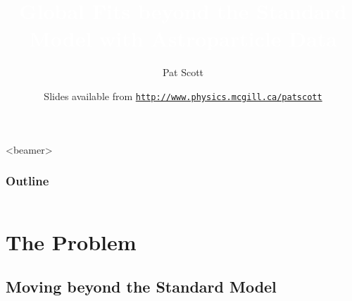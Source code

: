 \documentclass[xcolor=dvipsnames]{beamer}
\title[{\textcolor{white}Global Fits beyond the Standard Model with Astroparticle Data}]{\textcolor{white}{Global Fits beyond the Standard Model with Astroparticle Data}}
\author[\textcolor{medgrey}{Pat Scott -- Aug 20 -- ICIC Opening Workshop}]{Pat Scott}
\institute{\small{Department of Physics, McGill University}}
\date[Aug 20 2012]{Slides available from \color[rgb]{0.1, 0.2, 0.6} \href{http://www.physics.mcgill.ca/~patscott}{\tt http://www.physics.mcgill.ca/{\urltilda}patscott}}
\begin{document}
\begin{frame}
  \titlepage
\end{frame}

\begin{frame}<beamer>
  \frametitle{Outline}
\begin{columns}[t]
  \tableofcontents[sections={1-3}]
\end{columns}	
\end{frame}

\section{The Problem}

\subsection{Moving beyond the Standard Model}
\end{document}
